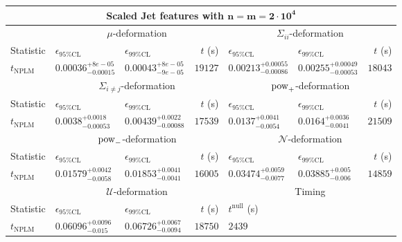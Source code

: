 \begin{tabular}{l|llr|llr}
	\toprule
	\multicolumn{7}{c}{{\bf Scaled Jet features with $\mathbf{n=m=2\cdot 10^{4}}$}} \\
	\toprule
	\multicolumn{1}{c}{} & \multicolumn{3}{c}{$\mu$-deformation} & \multicolumn{3}{c}{$\Sigma_{ii}$-deformation} \\
	Statistic & $\epsilon_{95\%\mathrm{CL}}$ & $\epsilon_{99\%\mathrm{CL}}$ & $t$ (s) & $\epsilon_{95\%\mathrm{CL}}$ & $\epsilon_{99\%\mathrm{CL}}$ & $t$ (s) \\
	\midrule
	$t_{\mathrm{NPLM}}$ & $0.00036_{-0.00015}^{+8e-05}$ & $0.00043_{-9e-05}^{+8e-05}$ & $19127$ & $0.00213_{-0.00086}^{+0.00055}$ & $0.00255_{-0.00053}^{+0.00049}$ & $18043$ \\
	\toprule
	\multicolumn{1}{c}{} & \multicolumn{3}{c}{$\Sigma_{i\neq j}$-deformation} & \multicolumn{3}{c}{$\rm{pow}_{+}$-deformation} \\
	Statistic & $\epsilon_{95\%\mathrm{CL}}$ & $\epsilon_{99\%\mathrm{CL}}$ & $t$ (s) & $\epsilon_{95\%\mathrm{CL}}$ & $\epsilon_{99\%\mathrm{CL}}$ & $t$ (s) \\
	\midrule
	$t_{\mathrm{NPLM}}$ & $0.0038_{-0.00053}^{+0.0018}$ & $0.00439_{-0.00088}^{+0.0022}$ & $17539$ & $0.0137_{-0.0054}^{+0.0041}$ & $0.0164_{-0.0041}^{+0.0036}$ & $21509$ \\
	\toprule
	\multicolumn{1}{c}{} & \multicolumn{3}{c}{$\rm{pow}_{-}$-deformation} & \multicolumn{3}{c}{$\mathcal{N}$-deformation} \\
	Statistic & $\epsilon_{95\%\mathrm{CL}}$ & $\epsilon_{99\%\mathrm{CL}}$ & $t$ (s) & $\epsilon_{95\%\mathrm{CL}}$ & $\epsilon_{99\%\mathrm{CL}}$ & $t$ (s) \\
	\midrule
	$t_{\mathrm{NPLM}}$ & $0.01579_{-0.0058}^{+0.0042}$ & $0.01853_{-0.0041}^{+0.0041}$ & $16005$ & $0.03474_{-0.0077}^{+0.0059}$ & $0.03885_{-0.006}^{+0.005}$ & $14859$ \\
	\toprule
	\multicolumn{1}{c}{} & \multicolumn{3}{c}{$\mathcal{U}$-deformation} & \multicolumn{3}{c}{Timing} \\
	Statistic & $\epsilon_{95\%\mathrm{CL}}$ & $\epsilon_{99\%\mathrm{CL}}$ & $t$ (s) & $t^{\mathrm{null}}$ (s) \\
	\midrule
	$t_{\mathrm{NPLM}}$ & $0.06096_{-0.015}^{+0.0096}$ & $0.06726_{-0.0094}^{+0.0067}$ & $18750$ & $2439$ \\
	\bottomrule
\end{tabular}